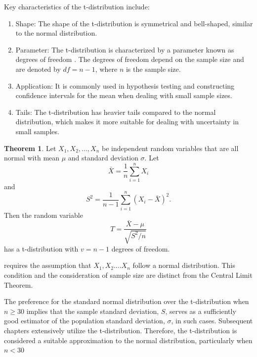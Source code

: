 \documentclass[12pt,a4paper]{article}
\theoremstyle{example}
\theoremstyle{definition}
\theoremstyle{theorem}
\newtheorem{theorem}{Theorem}
\begin{document}
Key characteristics of the t-distribution include:
\begin{enumerate}
    \item     Shape: The shape of the t-distribution is symmetrical and bell-shaped, similar to the normal distribution.

    \item  Parameter: The t-distribution is characterized by a parameter known as degrees of freedom . The degrees of freedom depend on the sample size and are denoted by $df=n-1$, where $n$ is the sample size.

    \item Application: It is commonly used in hypothesis testing and constructing confidence intervals for the mean when dealing with small sample sizes.

    \item Tails: The t-distribution has heavier tails compared to the normal distribution, which makes it more suitable for dealing with uncertainty in small samples.
\end{enumerate}

\begin{theorem}


Let \(X_1, X_2, \ldots, X_n\) be independent random variables that are all normal with mean \(\mu\) and standard deviation \(\sigma\). Let
\[
\bar{X} = \frac{1}{n}\sum_{i=1}^{n} X_i
\]
and
\[
S^2 = \frac{1}{n-1}\sum_{i=1}^{n} (X_i - \bar{X})^2.
\]
Then the random variable
\[
T = \frac{\bar{X} - \mu}{\sqrt{S^2/n}}
\]
has a t-distribution with \(v = n - 1\) degrees of freedom.


\label{var_dist}

\end{theorem} 
requires the assumption that $X_1, X_2....X_n$ follow a normal distribution. This condition and the consideration of sample size are distinct from the Central Limit Theorem.

The preference for the standard normal distribution over the t-distribution when $n\geq 30$ implies that the sample standard deviation, $S$, serves as a sufficiently good estimator of the population standard deviation, $\sigma$, in such cases. Subsequent chapters extensively utilize the t-distribution. Therefore, the t-distribution is considered a suitable approximation to the normal distribution, particularly when $n<30$
\end{document}
